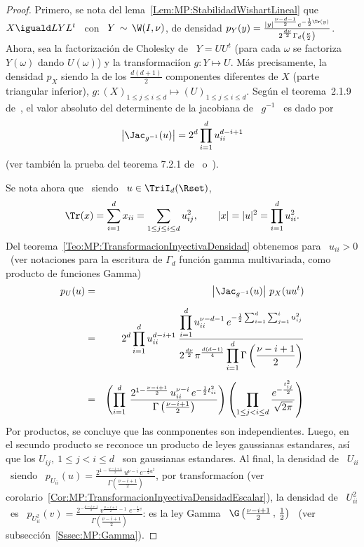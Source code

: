 \begin{proof}
  Primero, se nota del lema~\ref{Lem:MP:StabilidadWishartLineal} que \ $X \iguald
  L  Y  L^t$  \  con  \  $Y  \, \sim  \,  \W(I,\nu)$,  de  densidad  $p_Y(y)  =
  \frac{|y|^{\frac{\nu-d-1}{2}}    e^{-\frac12    \Tr(y)}}{2^{\frac{d   \nu}{2}}
    \Gamma_d\left(  \frac{\nu}{2} \right)}$.  Ahora, sea  la  factorizaci\'on de
  Cholesky de  \ $Y =  U U^t$ (\ie  para cada $\omega$ se  factoriza $Y(\omega)$
  dando  $U(\omega)$)   y  la  transformaci\'ion   $g:  Y  \mapsto   U$.   M\'as
  precisamente,  la  densidad  $p_X$   siendo  la  de  los  $\frac{d  (d+1)}{2}$
  componentes diferentes  de $X$ (parte  triangular inferior), $g: (X)_{1  \le j
    \le i \le d} \mapsto (U)_{1 \le  j \le i \le d}$.
  Seg\'un el  teorema~2.1.9 de~\cite{Mui82}, el valor  absoluto del determinente
  de la jacobiana de \ $g^{-1}$ \ es dado por
  \[
  \left| \Jac_{g^{-1}}(u) \right| = 2^d \prod_{i=1}^d u_{ii}^{d-i+1}
  \]
  (ver tambi\'en la prueba del teorema 7.2.1 de~\cite{And03} o~\cite[Prop.~2.22]{BilBre99}).
  
  Se nota ahora que \ siendo \ $u \in \TriI_d(\Rset)$,
  \[
  \Tr(x) =  \sum_{i=1}^d x_{ii}  = \sum_{1 \le j \le i \le d} u_{ij}^2, \qquad
  |x| = |u|^2 = \prod_{i=1}^d u_{ii}^2.
  \]
  Del  teorema~\ref{Teo:MP:TransformacionInyectivaDensidad}   obtenemos  para  \
  $u_{ii}  > 0$ \  (ver notaciones  para la  escritura de  $\Gamma_d$ funci\'on
  gamma multivariada, como producto de funciones Gamma)
  \begin{eqnarray*}
  p_U(u) & = &\left| \Jac_{g^{-1}}(u) \right| \,  p_X(u u^t) \\[2mm]
  & = & 2^d \prod_{i=1}^d u_{ii}^{d-i+1} \: \frac{\displaystyle \prod_{i=1}^d
  u_{ii}^{\nu-d-1} \, e^{ -\frac12 \sum_{i=1}^d \sum_{j=1}^i  u_{ij}^2}}{\displaystyle
  2^{\frac{d \nu}{2}} \pi^{\frac{d (d-1)}{4}} \prod_{i=1}^d \Gamma\left(
  \frac{\nu-i+1}{2} \right)}\\[2mm]
  & = & \left( \prod_{i=1}^d \: \frac{2^{1 - \frac{\nu-i+1}{2}} \,
  u_{ii}^{\nu-i} \, e^{-\frac12 t_{ii}^2}}{\Gamma\left( \frac{\nu-i+1}{2} \right)}
  \right) \left( \prod_{1 \le j < i \le d} \frac{\displaystyle
  e^{-\frac{t_{ij}^2}{2}}}{\sqrt{2 \pi}} \right)
  \end{eqnarray*}
  Por productos, se concluye que  las conmponentes son independientes. Luego, en
  el secundo  producto se  reconoce un producto  de leyes  gaussianas estandares,
  as\'i que los  $U_{ij}, \: 1 \le j  < i \le d$ \ son  gaussianas estandares. Al
  final,   la   densidad  de   \   $U_{ii}$   \   siendo  \   $p_{U_{ii}}(u)   =
  \frac{2^{1-\frac{\nu-i+1}{2}}  \, u^{\nu-i} \,  e^{-\frac12 u^2}}{\Gamma\left(
      \frac{\nu-i+1}{2}      \right)}$,      por      transformac\'ion      (ver
  corolario~\ref{Cor:MP:TransformacionInyectivaDensidadEscalar}), la densidad de
  \  $U_{ii}^2$  \  es  \  $p_{U_{ii}^2}(v)  =  \frac{2^{-\frac{\nu-i+1}{2}}  \,
    v^{\frac{\nu-i+1}{2}-1} \, \, e^{-\frac12 v}}{\Gamma\left( \frac{\nu-i+1}{2}
    \right)}$: es  la ley  Gamma \ $\G\left(  \frac{\nu-i+1}{2} \, ,  \, \frac12
  \right)$ \ (ver subsecci\'on~\ref{Sssec:MP:Gamma}).
\end{proof}

